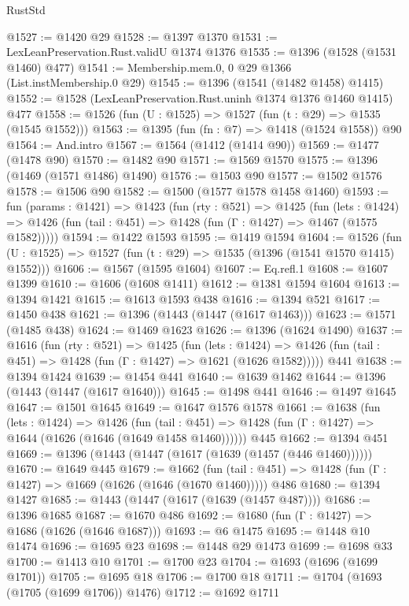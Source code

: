\begin{lexlean}{RustStd}
\begin{coremodule}
@1527 := @1420 @29
@1528 := @1397 @1370
@1531 := LexLeanPreservation.Rust.validU @1374 @1376
@1535 := @1396 (@1528 (@1531 @1460) @477)
@1541 := Membership.mem.{0, 0} @29 @1366 (List.instMembership.{0} @29)
@1545 := @1396 (@1541 (@1482 @1458) @1415)
@1552 := @1528 (LexLeanPreservation.Rust.uninh @1374 @1376 @1460 @1415) @477
@1558 := @1526 (fun (U : @1525) => @1527 (fun (t : @29) => @1535 (@1545 @1552)))
@1563 := @1395 (fun (fn : @7) => @1418 (@1524 @1558)) @90
@1564 := And.intro
@1567 := @1564 (@1412 (@1414 @90))
@1569 := @1477 (@1478 @90)
@1570 := @1482 @90
@1571 := @1569 @1570
@1575 := @1396 (@1469 (@1571 @1486) @1490)
@1576 := @1503 @90
@1577 := @1502 @1576
@1578 := @1506 @90
@1582 := @1500 (@1577 @1578 @1458 @1460)
@1593 := fun (params : @1421) =>
  @1423
    (fun (rty : @521) =>
    @1425
      (fun (lets : @1424) =>
      @1426 (fun (tail : @451) => @1428 (fun (Γ : @1427) => @1467 (@1575 @1582)))))
@1594 := @1422 @1593
@1595 := @1419 @1594
@1604 := @1526 (fun (U : @1525) => @1527 (fun (t : @29) => @1535 (@1396 (@1541 @1570 @1415) @1552)))
@1606 := @1567 (@1595 @1604)
@1607 := Eq.refl.{1}
@1608 := @1607 @1399
@1610 := @1606 (@1608 @1411)
@1612 := @1381 @1594 @1604
@1613 := @1394 @1421
@1615 := @1613 @1593 @438
@1616 := @1394 @521
@1617 := @1450 @438
@1621 := @1396 (@1443 (@1447 (@1617 @1463)))
@1623 := @1571 (@1485 @438)
@1624 := @1469 @1623
@1626 := @1396 (@1624 @1490)
@1637 := @1616
    (fun (rty : @521) =>
    @1425
      (fun (lets : @1424) =>
      @1426 (fun (tail : @451) => @1428 (fun (Γ : @1427) => @1621 (@1626 @1582)))))
    @441
@1638 := @1394 @1424
@1639 := @1454 @441
@1640 := @1639 @1462
@1644 := @1396 (@1443 (@1447 (@1617 @1640)))
@1645 := @1498 @441
@1646 := @1497 @1645
@1647 := @1501 @1645
@1649 := @1647 @1576 @1578
@1661 := @1638
    (fun (lets : @1424) =>
    @1426
      (fun (tail : @451) => @1428 (fun (Γ : @1427) => @1644 (@1626 (@1646 (@1649 @1458 @1460))))))
    @445
@1662 := @1394 @451
@1669 := @1396 (@1443 (@1447 (@1617 (@1639 (@1457 (@446 @1460))))))
@1670 := @1649 @445
@1679 := @1662
    (fun (tail : @451) => @1428 (fun (Γ : @1427) => @1669 (@1626 (@1646 (@1670 @1460)))))
    @486
@1680 := @1394 @1427
@1685 := @1443 (@1447 (@1617 (@1639 (@1457 @487))))
@1686 := @1396 @1685
@1687 := @1670 @486
@1692 := @1680 (fun (Γ : @1427) => @1686 (@1626 (@1646 @1687)))
@1693 := @6 @1475
@1695 := @1448 @10 @1474
@1696 := @1695 @23
@1698 := @1448 @29 @1473
@1699 := @1698 @33
@1700 := @1413 @10
@1701 := @1700 @23
@1704 := @1693 (@1696 (@1699 @1701))
@1705 := @1695 @18
@1706 := @1700 @18
@1711 := @1704 (@1693 (@1705 (@1699 @1706)) @1476)
@1712 := @1692 @1711

\end{coremodule}
\end{lexlean}

